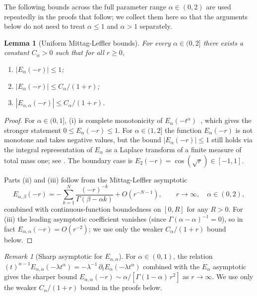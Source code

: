 \documentclass[11pt]{article}
\newtheorem{lemma}[theorem]{Lemma}
\theoremstyle{definition}
\theoremstyle{remark}
\newtheorem{remark}[theorem]{Remark}
\begin{document}
The following bounds across the full parameter range
$\alpha \in (0, 2)$ are used repeatedly in the proofs
that follow; we collect them here so that the
arguments below do not need to treat $\alpha \leq 1$
and $\alpha > 1$ separately.

\begin{lemma}[Uniform Mittag-Leffler bounds]
\label{lem:ml_bounds}
For every $\alpha \in (0, 2]$ there exists a
constant $C_\alpha > 0$ such that for all $r \geq 0$,
\begin{enumerate}[label=\textnormal{(\roman*)}]
\item $|E_\alpha(-r)| \leq 1$;
\item $|E_\alpha(-r)| \leq C_\alpha/(1 + r)$;
\item $|E_{\alpha,\alpha}(-r)| \leq C_\alpha/(1 + r)$.
\end{enumerate}
\end{lemma}

\begin{proof}
For $\alpha \in (0, 1]$, (i) is complete monotonicity
of $E_\alpha(-t^\alpha)$~\cite{pollard1948,schneider1996},
which gives the stronger statement
$0 \leq E_\alpha(-r) \leq 1$.  For $\alpha \in (1, 2]$
the function $E_\alpha(-r)$ is not monotone and takes
negative values, but the bound $|E_\alpha(-r)| \leq 1$
still holds via the integral representation of
$E_\alpha$ as a Laplace transform of a finite measure
of total mass one; see \cite[Prop.~3.10, \S4.3]{gorenflo2014}.
The boundary case is
$E_2(-r) = \cos(\sqrt{r}) \in [-1, 1]$.

Parts (ii) and (iii) follow from the Mittag-Leffler
asymptotic~\cite[Ch.~4]{gorenflo2014}
\[
E_{\alpha,\beta}(-r) = -\sum_{k=1}^{N}
\frac{(-r)^{-k}}{\Gamma(\beta - \alpha k)}
+ O(r^{-N-1}),
\qquad r \to \infty, \quad \alpha \in (0, 2),
\]
combined with continuous-function boundedness on
$[0, R]$ for any $R > 0$.  For (iii) the leading
asymptotic coefficient vanishes (since
$\Gamma(\alpha - \alpha)^{-1} = 0$), so in fact
$E_{\alpha,\alpha}(-r) = O(r^{-2})$; we use only
the weaker $C_\alpha/(1+r)$ bound below.
\end{proof}

\begin{remark}[Sharp asymptotic for
$E_{\alpha,\alpha}$]
For $\alpha \in (0, 1)$, the relation
$(t)^{\alpha-1} E_{\alpha,\alpha}(-\lambda t^\alpha)
= -\lambda^{-1}\,\partial_t
E_\alpha(-\lambda t^\alpha)$
combined with the $E_\alpha$ asymptotic gives the
sharper bound
$E_{\alpha,\alpha}(-r) \sim \alpha/
[\Gamma(1-\alpha)\,r^2]$
as $r \to \infty$.  We use only the weaker
$C_\alpha/(1+r)$ bound in the proofs below.
\end{remark}
\end{document}
